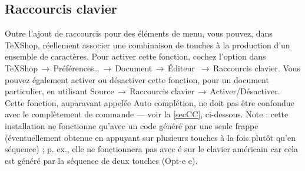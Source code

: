 \documentclass[11pt,french]{article}
\newcommand{\TS}{\textsf{\TeX Shop}}
\newcommand{\cmd}[1]{\textsf{#1}}
\newcommand{\mnu}[1]{\textsf{#1}}
\newcommand{\To}{\,\(\to\)\,}
\begin{document}
%
%



\subsection{Raccourcis clavier}

Outre l'ajout de raccourcis pour des éléments de menu, vous pouvez, dans \TS{}, réellement associer une combinaison de touches à la production d'un ensemble de caractères. Pour activer cette fonction, cochez l'option dans  \mnu{TeXShop}\To\mnu{Préférences…}\To\mnu{Document}\To\mnu{Éditeur} \To\mnu{Raccourcis clavier}. Vous pouvez également activer ou désactiver cette fonction, pour un document particulier, en utilisant \mnu{Source}\To\mnu{Raccourcis clavier}\To\mnu{Activer/Désactiver}. Cette fonction, auparavant appelée Auto complétion, ne doit pas être confondue avec le complètement de commande --- voir la \cref{secCC}, ci-dessous. Note : cette installation ne fonctionne qu'avec un code généré par une seule frappe (éventuellement obtenue en appuyant sur plusieurs touches à la fois plutôt qu'en séquence) ; p. ex., elle ne fonctionnera pas avec é sur le clavier américain car cela est généré par la séquence de deux touches (\cmd{Opt-e e}).
\end{document}
